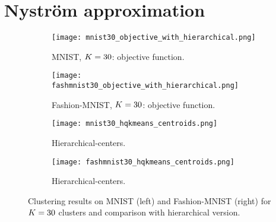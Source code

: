 \section{Nyström approximation}
\label{supp:nystrom}
\begin{figure*}[h]
\begin{subfigure}[b]{.49\textwidth}
\texttt{[image: mnist30\_objective\_with\_hierarchical.png]}
\caption{MNIST, $K=30$: objective function.}
\label{fig:mnist:objfunhier}
\end{subfigure}
\begin{subfigure}[b]{.49\textwidth}
\texttt{[image: fashmnist30\_objective\_with\_hierarchical.png]}
\caption{Fashion-MNIST, $K=30$: objective function.}
\label{fig:fmnist:objfunhier}
\end{subfigure}
\begin{subfigure}[t]{.49\textwidth}
\texttt{[image: mnist30\_hqkmeans\_centroids.png]}
\caption{Hierarchical-\palm \qkmeans centers.}
\label{fig:mnist:hqkmeans:centers}
\end{subfigure}
\begin{subfigure}[t]{.49\textwidth}
\texttt{[image: fashmnist30\_hqkmeans\_centroids.png]}
\caption{Hierarchical-\palm \qkmeans centers.}
\label{fig:fmnist:hqkmeans:centers}
\end{subfigure}
\caption{Clustering results on MNIST (left) and Fashion-MNIST (right) for $K=30$ clusters and comparison with hierarchical version.}
\end{figure*}

